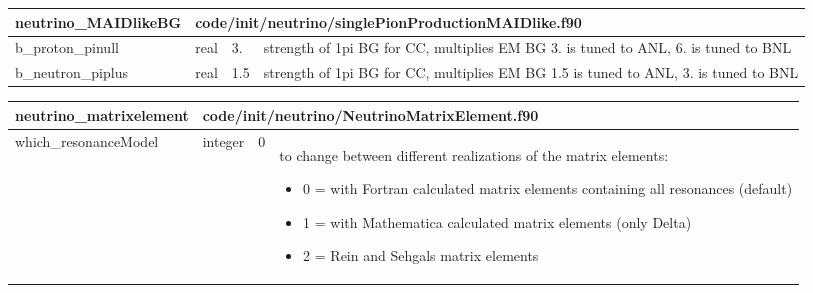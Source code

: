 \documentclass{article}
\begin{document}
\begin{longtable}{llll}
\toprule
\textbf{\large{neutrino\_MAIDlikeBG}} & \multicolumn{3}{l}{\footnotesize{code/init/neutrino/singlePionProductionMAIDlike.f90}}\\*
\midrule
\endfirsthead
\midrule
\endhead
b\_proton\_pinull & \begin{minipage}[t]{2cm}real\end{minipage} & \begin{minipage}[t]{2cm}3.\end{minipage} & \begin{minipage}[t]{12cm}strength of 1pi BG for CC, multiplies EM BG 3. is  tuned to ANL, 6. is tuned to BNL\end{minipage}\\*
\midrule
b\_neutron\_piplus & \begin{minipage}[t]{2cm}real\end{minipage} & \begin{minipage}[t]{2cm}1.5\end{minipage} & \begin{minipage}[t]{12cm}strength of 1pi BG for CC, multiplies EM BG 1.5 is tuned to ANL, 3. is tuned to BNL\end{minipage}\\*
\bottomrule
\end{longtable}
{ }




\begin{longtable}{llll}
\toprule
\textbf{\large{neutrino\_matrixelement}} & \multicolumn{3}{l}{\footnotesize{code/init/neutrino/NeutrinoMatrixElement.f90}}\\*
\midrule
\endfirsthead
\midrule
\endhead
which\_resonanceModel & \begin{minipage}[t]{2cm}integer\end{minipage} & \begin{minipage}[t]{2cm}0\end{minipage} & \begin{minipage}[t]{12cm}to change between different realizations of the matrix elements:\begin{itemize}\leftmargin0em\itemindent0pt\item 0 = with Fortran calculated matrix elements containing all resonances (default)\item 1 = with Mathematica calculated matrix elements (only Delta)\item 2 = Rein and Sehgals matrix elements\end{itemize}\end{minipage}\\*
\bottomrule
\end{longtable}
{ }
\end{document}
